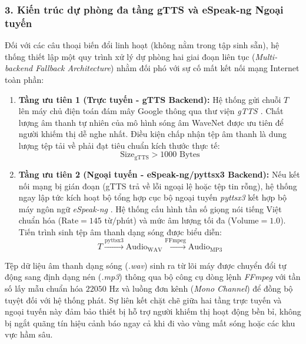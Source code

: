 \subsubsection*{3. Kiến trúc dự phòng đa tầng gTTS và eSpeak-ng Ngoại tuyến}

Đối với các câu thoại biến đổi linh hoạt (không nằm trong tập sinh sẵn), hệ thống thiết lập một quy trình xử lý dự phòng hai giai đoạn liên tục (\textit{Multi-backend Fallback Architecture}) nhằm đối phó với sự cố mất kết nối mạng Internet toàn phần:

\begin{enumerate}
    \item \textbf{Tầng ưu tiên 1 (Trực tuyến - gTTS Backend):} Hệ thống gửi chuỗi $T$ lên máy chủ điện toán đám mây Google thông qua thư viện \textit{gTTS \cite{Reference13}}. Chất lượng âm thanh tự nhiên của mô hình sóng âm WaveNet được ưu tiên để người khiếm thị dễ nghe nhất. Điều kiện chấp nhận tệp âm thanh là dung lượng tệp tải về phải đạt tiêu chuẩn kích thước thực tế:
    \begin{equation}
        \text{Size}_{\text{gTTS}} > 1000 \text{ Bytes}
    \end{equation}
    
    \item \textbf{Tầng ưu tiên 2 (Ngoại tuyến - eSpeak-ng/pyttsx3 Backend):} Nếu kết nối mạng bị gián đoạn (gTTS trả về lỗi ngoại lệ hoặc tệp tin rỗng), hệ thống ngay lập tức kích hoạt bộ tổng hợp cục bộ ngoại tuyến \textit{pyttsx3} kết hợp bộ máy ngôn ngữ \textit{eSpeak-ng} \cite{Reference13}. Hệ thống cấu hình tần số giọng nói tiếng Việt chuẩn hóa ($\text{Rate} = 145 \text{ từ/phút}$) và mức âm lượng tối đa ($\text{Volume} = 1.0$). Tiến trình sinh tệp âm thanh dạng sóng được biểu diễn:
    \begin{equation}
        T \xrightarrow{\text{pyttsx3}} \text{Audio}_{\text{WAV}} \xrightarrow{\text{FFmpeg}} \text{Audio}_{\text{MP3}}
    \end{equation}
\end{enumerate}

Tệp dữ liệu âm thanh dạng sóng (\textit{.wav}) sinh ra từ lõi máy được chuyển đổi tự động sang định dạng nén (\textit{.mp3}) thông qua bộ công cụ dòng lệnh \textit{FFmpeg} với tần số lấy mẫu chuẩn hóa $22050 \text{ Hz}$ và luồng đơn kênh (\textit{Mono Channel}) để đồng bộ tuyệt đối với hệ thống phát. Sự liên kết chặt chẽ giữa hai tầng trực tuyến và ngoại tuyến này đảm bảo thiết bị hỗ trợ người khiếm thị hoạt động bền bỉ, không bị ngắt quãng tín hiệu cảnh báo ngay cả khi đi vào vùng mất sóng hoặc các khu vực hầm sâu.